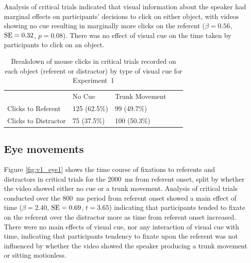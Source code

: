 \documentclass[a4paper,man,natbib]{apa6}
\newcommand{\resultsLog}[3]{$\beta = #1$, $\textnormal{SE} = #2$, $p #3$}
\newcommand{\resultsLM}[3]{$\beta = #1$, $\textnormal{SE} = #2$, $t #3$}
\begin{document}
Analysis of critical trials indicated that visual information about the speaker had marginal effects on participants' decisions to click on either object, with videos showing no cue resulting in marginally more clicks on the referent (\resultsLog{0.56}{0.32}{=0.08}).
There was no effect of visual cue on the time taken by participants to click on an object.

\begin{table}
\caption{Breakdown of mouse clicks in critical trials recorded on each object (referent or distractor) by type of visual cue for Experiment~1}
\label{table:v1_clicks}
\begin{tabularx}{\linewidth}{YYYYY}
\hline
& No Cue & Trunk Movement \\
Clicks to Referent & 125 (62.5\%) & 99 (49.7\%) \\ 
Clicks to Distractor & 75 (37.5\%) & 100 (50.3\%) \\
\hline
\end{tabularx}
\end{table}

\subsection{Eye movements}
Figure \ref{fig:v1_eye1} shows the time course of fixations to referents and distractors in critical trials for the 2000~ms from referent onset, split by whether the video showed either no cue or a trunk movement.
Analysis of critical trials conducted over the 800~ms period from referent onset showed a main effect of time (\resultsLM{2.40}{0.69}{=3.65}) indicating that participants tended to fixate on the referent over the distractor more as time from referent onset increased.
There were no main effects of visual cue, nor any interaction of visual cue with time, indicating that participants tendency to fixate upon the referent was not influenced by whether the video showed the speaker producing a trunk movement or sitting motionless.
\end{document}
